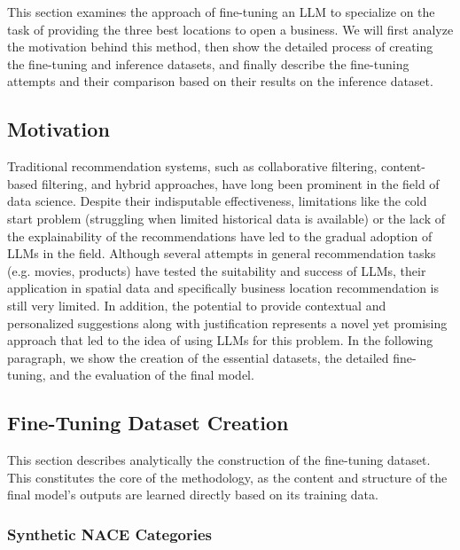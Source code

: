 This section examines the approach of fine-tuning an LLM to specialize on the task of providing the three best locations to open a business. We will first analyze the motivation behind this method, then show the detailed process of creating the fine-tuning and inference datasets, and finally describe the fine-tuning attempts and their comparison based on their results on the inference dataset.


\subsection{Motivation}

Traditional recommendation systems, such as collaborative filtering, content-based filtering, and hybrid approaches, have long been prominent in the field of data science. Despite their indisputable effectiveness, limitations like the cold start problem (struggling when limited historical data is available) or the lack of the explainability of the recommendations have led to the gradual adoption of LLMs in the field. Although several attempts in general recommendation tasks (e.g. movies, products) have tested the suitability and success of LLMs, their application in spatial data and specifically business location recommendation is still very limited. In addition, the potential to provide contextual and personalized suggestions along with justification represents a novel yet promising approach that led to the idea of using LLMs for this problem. In the following paragraph, we show the creation of the essential datasets, the detailed fine-tuning, and the evaluation of the final model. 


\subsection{Fine-Tuning Dataset Creation}
\label{sec:fine_tune_dataset_creation}

This section describes analytically the construction of the fine-tuning dataset. This constitutes the core of the methodology, as the 
content and structure of the final model's outputs are learned directly based on its training data. 


\subsubsection{Synthetic NACE Categories}


